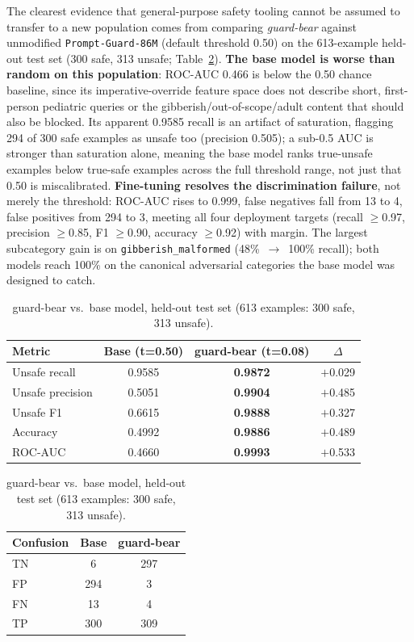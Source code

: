 \documentclass[pdflatex,sn-mathphys-num]{sn-jnl}%
\begin{document}
The clearest evidence that general-purpose safety tooling cannot be assumed to transfer to a new population comes from comparing \textit{guard-bear} against unmodified \texttt{Prompt-Guard-86M} (default threshold 0.50) on the 613-example held-out test set (300 safe, 313 unsafe; Table~\ref{tab:guardheadline}). \textbf{The base model is worse than random on this population}: ROC-AUC 0.466 is below the 0.50 chance baseline, since its imperative-override feature space does not describe short, first-person pediatric queries or the gibberish/out-of-scope/adult content that should also be blocked. Its apparent 0.9585 recall is an artifact of saturation, flagging 294 of 300 safe examples as unsafe too (precision 0.505); a sub-0.5 AUC is stronger than saturation alone, meaning the base model ranks true-unsafe examples below true-safe examples across the full threshold range, not just that 0.50 is miscalibrated. \textbf{Fine-tuning resolves the discrimination failure}, not merely the threshold: ROC-AUC rises to 0.999, false negatives fall from 13 to 4, false positives from 294 to 3, meeting all four deployment targets (recall $\geq$0.97, precision $\geq$0.85, F1 $\geq$0.90, accuracy $\geq$0.92) with margin. The largest subcategory gain is on \texttt{gibberish\_malformed} (48\%~$\to$~100\% recall); both models reach 100\% on the canonical adversarial categories the base model was designed to catch.

\begin{table}[!h]
  \centering
  \caption{guard-bear vs.\ base model, held-out test set (613 examples: 300 safe, 313 unsafe).}
  \label{tab:guardheadline}
  \small
  \begin{tabular}{@{}lccc@{}}
    \toprule
    Metric & Base (t=0.50) & guard-bear (t=0.08) & $\Delta$ \\
    \midrule
    Unsafe recall    & 0.9585 & \textbf{0.9872} & $+$0.029 \\
    Unsafe precision & 0.5051 & \textbf{0.9904} & $+$0.485 \\
    Unsafe F1        & 0.6615 & \textbf{0.9888} & $+$0.327 \\
    Accuracy         & 0.4992 & \textbf{0.9886} & $+$0.489 \\
    ROC-AUC          & 0.4660 & \textbf{0.9993} & $+$0.533 \\
    \bottomrule
  \end{tabular}
  \qquad
  \begin{tabular}{@{}lcc@{}}
    \toprule
    Confusion & Base & guard-bear \\
    \midrule
    TN & 6   & 297 \\
    FP & 294 & 3   \\
    FN & 13  & 4   \\
    TP & 300 & 309 \\
    \bottomrule
  \end{tabular}
\end{table}
\end{document}
